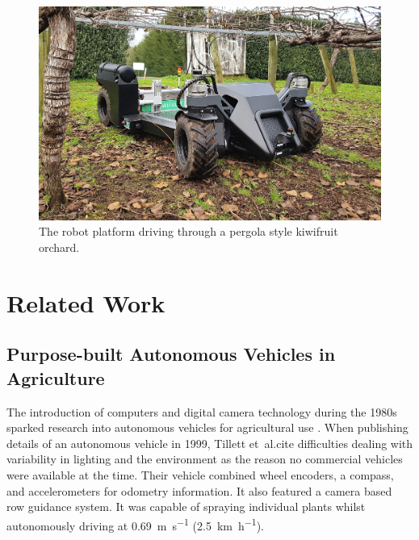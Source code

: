 \documentclass[preprint,authoryear,12pt]{elsarticle}
\begin{document}
    \begin{figure}[htb]
        \centering
        \includegraphics[width=\linewidth]{imgs/photos/suzy_general.jpg}
        \caption{
            The robot platform driving through a pergola style kiwifruit orchard.
        }
        \label{fig:suzy}
    \end{figure}


\section{Related Work}
\label{sect:review}

    \subsection{Purpose-built Autonomous Vehicles in Agriculture}

        The introduction of computers and digital camera technology during the 1980s sparked research into autonomous vehicles for agricultural use \citep{Li2009}.
        When publishing details of an autonomous vehicle in 1999, Tillett et~al.\@ cite difficulties dealing with variability in lighting and the environment as the reason no commercial vehicles were available at the time.
        Their vehicle combined wheel encoders, a compass, and accelerometers for odometry information.
        It also featured a camera based row guidance system.
        It was capable of spraying individual plants whilst autonomously driving at \SI{0.69}{\meter\per\second} (\SI{2.5}{\kilo\meter\per\hour}).
\end{document}
